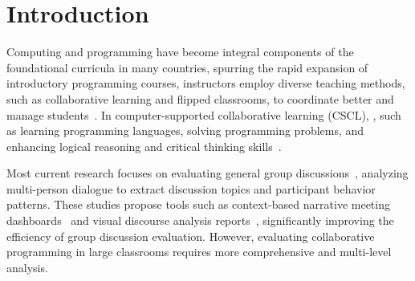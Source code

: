 \section{Introduction} 
\label{sec:introduction}
Computing and programming have become integral components of the foundational curricula in many countries, spurring the rapid expansion of introductory programming courses,  instructors employ diverse teaching methods, such as collaborative learning and flipped classrooms, to coordinate better and manage students~\cite{yan2024evidence}.  
In computer-supported collaborative learning (CSCL), , such as learning programming languages, solving programming problems, and enhancing logical reasoning and critical thinking skills~\cite{ouyang2022applying}.

Most current research focuses on evaluating general group discussions~\cite{niemantsverdriet2017recurring}, analyzing multi-person dialogue to extract discussion topics and participant behavior patterns. These studies propose tools such as context-based narrative meeting dashboards~\cite{samrose2021meetingcoach} and visual discourse analysis reports~\cite{sevastjanova2021visinreport}, significantly improving the efficiency of group discussion evaluation. However, evaluating collaborative programming in large classrooms requires more comprehensive and multi-level analysis.

